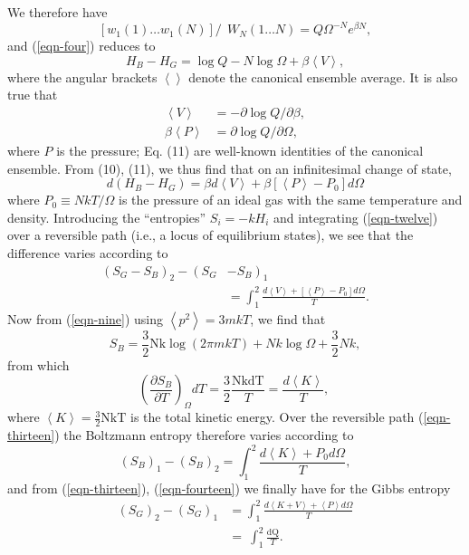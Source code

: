 \documentclass[twocolumn]{article}
\begin{document}
We therefore have
%
\[
\left\lbrack w_{1}\left( 1 \right)\ldots w_{1}\left( N \right) \right\rbrack/\ \ W_{N}(1\ldots N) = Q\Omega^{- N}e^{\beta N},
\]
%
and (\ref{eqn-four}) reduces to
%
\begin{equation}
H_{B} - H_{G} = \log Q - N\log\Omega + \beta\left\langle V \right\rangle,
\label{eqn-ten}
\end{equation}
%
where the angular brackets \(\left\langle \right\rangle\) denote the
canonical ensemble average. It is also true that
%
\begin{align}
\left\langle V \right\rangle & = - \partial\log Q/\partial\beta, \nonumber \\
\beta\left\langle P \right\rangle & = \partial\log Q/\partial\Omega,
\label{eqn-eleven}
\end{align}
%
where \(P\) is the pressure; Eq. (11) are well-known identities of the
canonical ensemble. From (10), (11), we thus find that on an
infinitesimal change of state,
%
\begin{equation}
d\left( H_{B} - H_{G} \right) = \beta d\left\langle V \right\rangle + \beta\left\lbrack \left\langle P \right\rangle - P_{0} \right\rbrack d\Omega
\label{eqn-twelve}
\end{equation}
%
where \(P_{0} \equiv NkT/\Omega\) is the pressure of an ideal gas with
the same temperature and density. Introducing the ``entropies''
\(S_{i} = - kH_{i}\) and integrating (\ref{eqn-twelve}) over a reversible path (i.e.,
a locus of equilibrium states), we see that the difference varies
according to
%
\begin{align}
\left( S_{G} - S_{B} \right)_{2} - \left( S_{G} \right. & \left. - S_{B} \right)_{1}  \nonumber \\
 & = \int_{1}^{2}\frac{d\left\langle V \right\rangle + \left\lbrack \left\langle P \right\rangle - P_{0} \right\rbrack d\Omega}{T}.
\label{eqn-thirteen}
\end{align}
%
Now from (\ref{eqn-nine}) using \(\left\langle p^{2} \right\rangle = 3mkT\), we find that
%
\[
S_{B} = \frac{3}{2}\text{Nk}\log\left( 2\pi mkT \right) + Nk\log\Omega + \frac{3}{2}Nk,
\]
%
from which
%
\[
\left( \frac{\partial S_{B}}{\partial T} \right)_{\Omega}dT = \frac{3}{2}\frac{\text{NkdT}}{T} = \frac{d\left\langle K \right\rangle}{T},\ 
\]
where \(\left\langle K \right\rangle = \frac{3}{2}\text{NkT}\) is the
total kinetic energy. Over the reversible path (\ref{eqn-thirteen}) the Boltzmann entropy therefore varies according to
%
\begin{equation}
\left( S_{B} \right)_{1} - \left( S_{B} \right)_{2} = \int_{1}^{2}\frac{d\left\langle K \right\rangle + P_{0}d\Omega}{T},
\label{eqn-fourteen}
\end{equation}
%
and from (\ref{eqn-thirteen}), (\ref{eqn-fourteen}) we finally have for the Gibbs entropy
%
\begin{align}
\left( S_{G} \right)_{2} - \left( S_{G} \right)_{1} & = \int_{1}^{2}\frac{d\left\langle K + V \right\rangle + \left\langle P \right\rangle d\Omega}{T} \nonumber \\& = \ \int_{1}^{2}{\frac{\text{dQ}}{T}.}
\label{eqn-fifteen}
\end{align}
\end{document}
